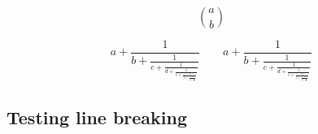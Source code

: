 \begin{dmath*}[compact,spread={1.250000\baselineskip}]
\binom{a }{ b}
\end{dmath*}

\begin{dmath*}[compact,spread={1.250000\baselineskip}]
a + \frac{1}{b + \frac{1}{c + \frac{1}{d + \frac{1}{e + \frac{1}{f + \frac{1}{g + \frac{1}{h}}}}}}} \qquad a + \frac{1}{\displaystyle b + \frac{1}{\displaystyle c + \frac{1}{\displaystyle d + \frac{1}{\displaystyle e + \frac{1}{\displaystyle f + \frac{1}{\displaystyle g + \frac{1}{h}}}}}}}
\end{dmath*}

\subsection{Testing line breaking}

